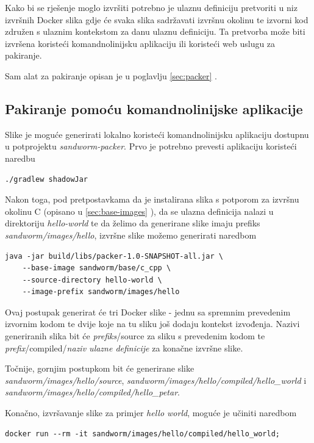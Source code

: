 \documentclass[times, utf8, zavrsni]{fer}
\begin{document}
{{{\begin{appendices}
Kako bi se rješenje moglo izvršiti potrebno je ulaznu definiciju pretvoriti u niz izvršnih Docker slika gdje će svaka slika sadržavati izvršnu okolinu te izvorni kod združen s ulaznim kontekstom za danu ulaznu definiciju. Ta pretvorba može biti izvršena koristeći komandnolinijsku aplikaciju ili koristeći web uslugu za pakiranje.

Sam alat za pakiranje opisan je u poglavlju \ref{sec:packer} .

\subsection{Pakiranje pomoću komandnolinijske aplikacije}

Slike je moguće generirati lokalno koristeći komandnolinijsku aplikaciju dostupnu u potprojektu {\textit{sandworm-packer}}. Prvo je potrebno prevesti aplikaciju koristeći naredbu

\begin{lstlisting}
./gradlew shadowJar
\end{lstlisting}

Nakon toga, pod pretpostavkama da je instalirana slika s potporom za izvršnu okolinu C (opisano u \ref{sec:base-images} ), da se ulazna definicija nalazi u direktoriju {\textit{hello-world}} te da želimo da generirane slike imaju prefiks {\textit{sandworm/images/hello}}, izvršne slike možemo generirati naredbom

\begin{lstlisting}
java -jar build/libs/packer-1.0-SNAPSHOT-all.jar \
	--base-image sandworm/base/c_cpp \
	--source-directory hello-world \
	--image-prefix sandworm/images/hello
\end{lstlisting}

Ovaj postupak generirat će tri Docker slike - jednu sa spremnim prevedenim izvornim kodom te dvije koje na tu sliku još dodaju kontekst izvođenja. Nazivi generiranih slika bit će {\textit{prefiks}}/source za sliku s prevedenim kodom te {\textit{prefix}}/compiled/{\textit{naziv ulazne definicije}} za konačne izvršne slike.

Točnije, gornjim postupkom bit će generirane slike {\textit{sandworm/images/hello/source}}, {\textit{sandworm/images/hello/compiled/hello\_world}} i {\textit{sandworm/images/hello/compiled/hello\_petar}}.

Konačno, izvršavanje slike za primjer {\textit{hello world}}, moguće je učiniti naredbom

\begin{lstlisting}
docker run --rm -it sandworm/images/hello/compiled/hello_world;
\end{lstlisting}


\end{appendices}}}}
\end{document}
